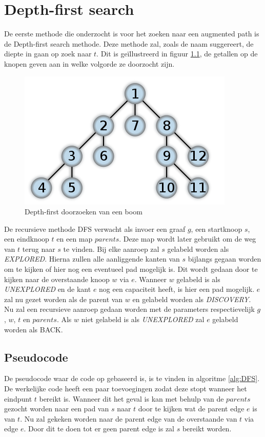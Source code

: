 \chapter{Depth-first search}
\label{chap:depthfirst}

De eerste methode die onderzocht is voor het zoeken naar een augmented path is de Depth-first search methode. Deze methode zal, zoals de naam suggereert, de diepte in gaan op zoek naar $t$. Dit is ge\"illustreerd in figuur \ref{fig:depthFirstTree}, de getallen op de knopen geven aan in welke volgorde ze doorzocht zijn.

\begin{figure}[h]
 \centering
 \includegraphics[width=0.5\linewidth]{depthfirst/depthfirsttree}
 \caption{Depth-first doorzoeken van een boom}
 \label{fig:depthFirstTree}
\end{figure}

De recursieve methode DFS verwacht als invoer een graaf $g$, een startknoop $s$, een eindknoop $t$ en een map $parents$. Deze map wordt later gebruikt om de weg van $t$ terug naar $s$ te vinden. Bij elke aanroep zal $s$ gelabeld worden als \textit{EXPLORED}. Hierna zullen alle aanliggende kanten van $s$ bijlangs gegaan worden om te kijken of hier nog een eventueel pad mogelijk is. Dit wordt gedaan door te kijken naar de overstaande knoop $w$ via $e$. Wanneer $w$ gelabeld is als \textit{UNEXPLORED} en de kant $e$ nog een capaciteit heeft, is hier een pad mogelijk. $e$ zal nu gezet worden als de parent van $w$ en gelabeld worden als \textit{DISCOVERY}. Nu zal een recursieve aanroep gedaan worden met de parameters respectievelijk $g$, $w$, $t$ en $parents$.
Als $w$ niet gelabeld is als \textit{UNEXPLORED} zal $e$ gelabeld worden als BACK.

\section{Pseudocode}
De pseudocode waar de code op gebaseerd is, is te vinden in algoritme \ref{alg:DFS}. De werkelijke code heeft een paar toevoegingen zodat deze stopt wanneer het eindpunt $t$ bereikt is. Wanneer dit het geval is kan met behulp van de $parents$ gezocht worden naar een pad van $s$ naar $t$ door te kijken wat de parent edge $e$ is van $t$. Nu zal gekeken worden naar de parent edge van de overstaande van $t$ via edge $e$. Door dit te doen tot er geen parent edge is zal $s$ bereikt worden.

